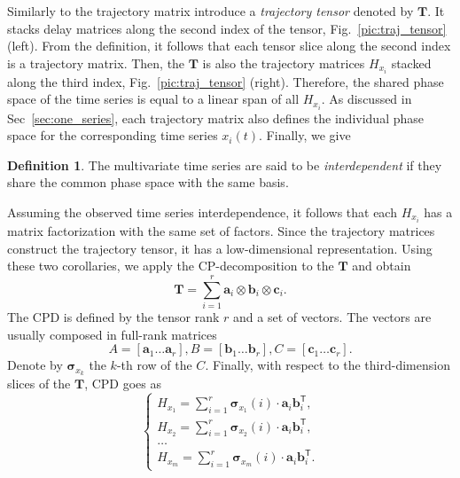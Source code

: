 \documentclass[referee, pdflatex, sn-mathphys-num]{sn-jnl}
\theoremstyle{definition}
\newtheorem{Def}{Definition}
\theoremstyle{plain}
\begin{document}
	Similarly to the trajectory matrix introduce a \textit{trajectory tensor} denoted by $ \mathbf{T} $. It stacks delay matrices along the second index of the tensor, Fig.~\ref{pic:traj_tensor} (left). From the definition, it follows that each tensor slice along the second index is a trajectory matrix. Then, the $ \mathbf{T} $ is also the trajectory matrices $ H_{x_i} $ stacked along the third index, Fig.~\ref{pic:traj_tensor} (right). Therefore, the shared phase space of the time series is equal to a linear span of all $ H_{x_i} $. As discussed in Sec~\ref{sec:one_series}, each trajectory matrix also defines the individual phase space for the corresponding time series $ x_i(t) $. Finally, we give
	
	\begin{Def}\label{def:interdepend}	
		The multivariate time series are said to be \emph{interdependent} if they share the common phase space with the same basis.
	\end{Def}
	
	Assuming the observed time series interdependence, it follows that each $ H_{x_i} $ has a matrix factorization with the same set of factors. Since the trajectory matrices construct the trajectory tensor, it has a low-dimensional representation. Using these two corollaries, we apply the CP-decomposition to the $ \mathbf{T} $ and obtain \begin{equation}\label{eq:CPD}
		\mathbf{T} = \sum\limits_{i = 1}^{r} \mathbf{a}_i \otimes \mathbf{b}_i \otimes \mathbf{c}_i .
	\end{equation} The CPD is defined by the tensor rank $ r $ and a set of vectors. The vectors are usually composed in full-rank matrices \begin{equation}\label{eq:cpd_matrices}
		A = [\mathbf{a}_1 \ldots \mathbf{a}_r], B = [\mathbf{b}_1 \ldots \mathbf{b}_r], C = [\mathbf{c}_1 \ldots \mathbf{c}_r] .
	\end{equation} Denote by $ \boldsymbol{\sigma}_{x_k} $ the $ k $-th row of the $ C $. Finally, with respect to the third-dimension slices of the $ \mathbf{T} $, CPD goes as \begin{equation}\label{eq:tSSA_decomp}
		\begin{cases}
			H_{x_1} = \sum\limits_{i = 1}^{r} \boldsymbol{\sigma}_{x_1}(i) \cdot \mathbf{a}_i  \mathbf{b}_i^{\mathsf{T}},  \\
			H_{x_2} = \sum\limits_{i = 1}^{r} \boldsymbol{\sigma}_{x_2}(i) \cdot \mathbf{a}_i  \mathbf{b}_i^{\mathsf{T}}, \\
			\ldots \\
			H_{x_m} = \sum\limits_{i = 1}^{r} \boldsymbol{\sigma}_{x_m}(i) \cdot \mathbf{a}_i  \mathbf{b}_i^{\mathsf{T}} .
		\end{cases}
	\end{equation}
	
\end{document}
